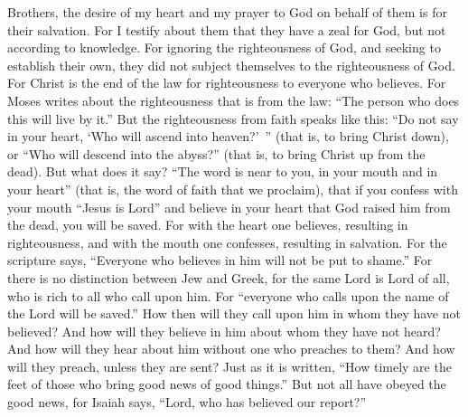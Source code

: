 \begin{biblechapter} %
 Brothers, the desire of my heart and my prayer to God on behalf of them is for their salvation.
\verse For I testify about them that they have a zeal for God, but not according to knowledge.
\verse For ignoring the righteousness of God, and seeking to establish their own, they did not subject themselves to the righteousness of God.
\verse For Christ is the end of the law for righteousness to everyone who believes.
\verse For Moses writes about the righteousness that is from the law: “The person who does this will live by it.”
\verse But the righteousness from faith speaks like this: “Do not say in your heart, ‘Who will ascend into heaven?’ ” (that is, to bring Christ down),
\verse or “Who will descend into the abyss?” (that is, to bring Christ up from the dead).
\verse But what does it say? “The word is near to you, in your mouth and in your heart” (that is, the word of faith that we proclaim),
\verse that if you confess with your mouth “Jesus is Lord” and believe in your heart that God raised him from the dead, you will be saved.
\verse For with the heart one believes, resulting in righteousness, and with the mouth one confesses, resulting in salvation.
\verse For the scripture says, “Everyone who believes in him will not be put to shame.”
\verse For there is no distinction between Jew and Greek, for the same Lord is Lord of all, who is rich to all who call upon him.
\verse For “everyone who calls upon the name of the Lord will be saved.”
\verse How then will they call upon him in whom they have not believed? And how will they believe in him about whom they have not heard? And how will they hear about him without one who preaches to them?
\verse And how will they preach, unless they are sent? Just as it is written, “How timely are the feet of those who bring good news of good things.”
\verse But not all have obeyed the good news, for Isaiah says, “Lord, who has believed our report?”

\end{biblechapter}
